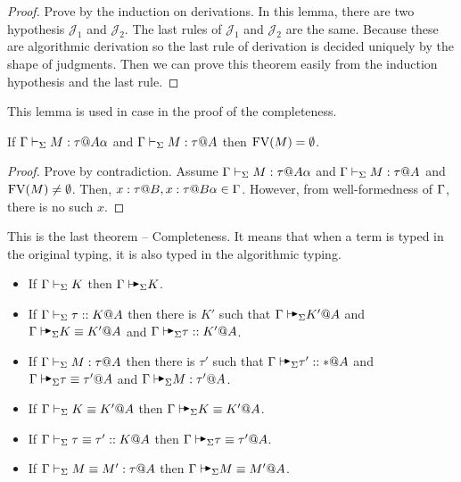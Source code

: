 \begin{proof}
    Prove by the induction on derivations.  In this lemma, there are two
    hypothesis \( \mathcal{J}_1 \) and \( \mathcal{J}_2 \).  The last rules of
    \( \mathcal{J}_1 \) and \( \mathcal{J}_2 \) are the same.  Because these
    are algorithmic derivation so the last rule of derivation is decided
    uniquely by the shape of judgments.  Then we can prove this theorem easily
    from the induction hypothesis and the last rule.
\end{proof}

This lemma is used in \QPercent case in the proof of the completeness.

\begin{lemma}
    \label{lemma:FreeVariableandStage}
    If \( \G\V M:\tau@{A\alpha} \) and \( \Gamma\vdash_\Sigma M:\tau @A \) then \( \text{FV}(M) = \emptyset \).
\end{lemma}

\begin{proof}
    Prove by contradiction. Assume \( \G\V M:\tau@{A\alpha} \) and \( \Gamma\vdash_\Sigma
    M:\tau @A \) and \( \text{FV}(M) \neq \emptyset \). Then, \( x : \tau @ B, x:
    \tau @ B\alpha \in \Gamma \). However, from well-formedness of \( \Gamma \), there
    is no such \( x \).
\end{proof}

This is the last theorem -- Completeness. It means that when a term is typed in
the original typing, it is also typed in the algorithmic typing.

\begin{theorem}
    \label{theorem:CompletenessofAlgorithmicTyping}
    \begin{itemize}
        \item If \(\Gamma\vdash_\Sigma K \) then \(\G\AVS K \).
        \item If \(\Gamma\vdash_\Sigma \tau ::K @ A \) then there is \(K'\) such that \( \G \AVS K' @ A \) and \( \G \AVS K\E K' @ A \) and \( \G\AVS \tau :: K' @ A \).
        \item If \(\Gamma\vdash_\Sigma M:\tau @ A \) then there is \(\tau'\) such that \( \G \AVS \tau' :: * @ A \) and \( \G \AVS \tau \E \tau' @ A \) and \( \G\AVS M:\tau' @ A \).
        \item If \(\Gamma\vdash_\Sigma K\equiv K' @ A \) then \(\G\AVS K\E K' @ A \).
        \item If \(\Gamma\vdash_\Sigma \tau \equiv \tau' :: K @ A \) then \(\G\AVS \tau \E \tau' @ A \).
        \item If \(\Gamma\vdash_\Sigma M\equiv M' : \tau @ A \) then \(\G \AVS M \E M' @ A \).
    \end{itemize}
\end{theorem}

